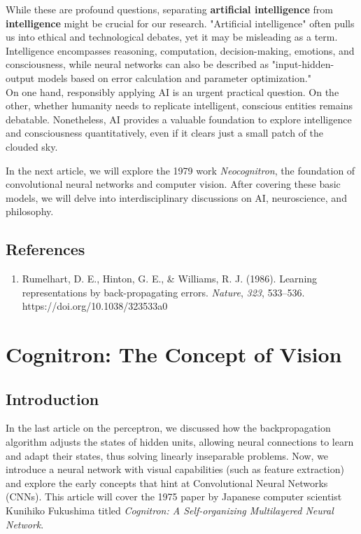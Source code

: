 \documentclass[11p,oneside]{book}
\begin{document}
While these are profound questions, separating \textbf{artificial intelligence} from \textbf{intelligence} might be crucial for our research. "Artificial intelligence" often pulls us into ethical and technological debates, yet it may be misleading as a term. Intelligence encompasses reasoning, computation, decision-making, emotions, and consciousness, while neural networks can also be described as "input-hidden-output models based on error calculation and parameter optimization." \\

On one hand, responsibly applying AI is an urgent practical question. On the other, whether humanity needs to replicate intelligent, conscious entities remains debatable. Nonetheless, AI provides a valuable foundation to explore intelligence and consciousness quantitatively, even if it clears just a small patch of the clouded sky.

In the next article, we will explore the 1979 work \textit{Neocognitron}, the foundation of convolutional neural networks and computer vision. After covering these basic models, we will delve into interdisciplinary discussions on AI, neuroscience, and philosophy.

\section*{References}

\begin{enumerate}
    \item Rumelhart, D. E., Hinton, G. E., \& Williams, R. J. (1986). Learning representations by back-propagating errors. \textit{Nature}, \textit{323}, 533–536. https://doi.org/10.1038/323533a0
\end{enumerate}

\chapter{Cognitron: The Concept of Vision}

\section*{Introduction}

In the last article on the perceptron, we discussed how the backpropagation algorithm adjusts the states of hidden units, allowing neural connections to learn and adapt their states, thus solving linearly inseparable problems. Now, we introduce a neural network with visual capabilities (such as feature extraction) and explore the early concepts that hint at Convolutional Neural Networks (CNNs). This article will cover the 1975 paper by Japanese computer scientist Kunihiko Fukushima titled \textit{Cognitron: A Self-organizing Multilayered Neural Network}.
\end{document}
